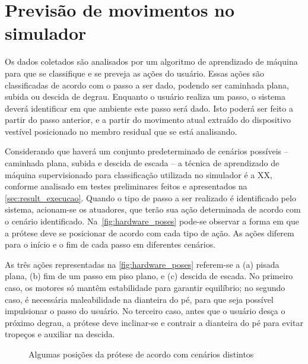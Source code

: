 \section{Previsão de movimentos no simulador}\label{sec:metodo_previsao}

Os dados coletados são analisados por um algoritmo de aprendizado de máquina para que se classifique e se preveja as ações do usuário. Essas ações são classificadas de acordo com o passo a ser dado, podendo ser caminhada plana, subida ou descida de degrau. Enquanto o usuário realiza um passo, o sistema deverá identificar em que ambiente este passo será dado. Isto poderá ser feito a partir do passo anterior, e a partir do movimento atual extraído do dispositivo vestível posicionado no membro residual que se está analisando.

Considerando que haverá um conjunto predeterminado de cenários possíveis -- caminhada plana, subida e descida de escada -- a técnica de aprendizado de máquina supervisionado para classificação utilizada no simulador é a XX, conforme analisado em testes preliminares feitos e apresentados na \autoref{sec:result_execucao}. Quando o tipo de passo a ser realizado é identificado pelo sistema, acionam-se os atuadores, que terão sua ação determinada de acordo com o cenário identificado. Na~\autoref{fig:hardware_poses} pode-se observar a forma em que a prótese deve se posicionar de acordo com cada tipo de ação. As ações diferem para o início e o fim de cada passo em diferentes cenários.

As três ações representadas na \autoref{fig:hardware_poses} referem-se a (a) pisada plana, (b) fim de um passo em piso plano, e (c) descida de escada. No primeiro caso, os motores só mantêm estabilidade para garantir equilíbrio; no segundo caso, é necessária maleabilidade na dianteira do pé, para que seja possível impulsionar o passo do usuário. No terceiro caso, antes que o usuário desça o próximo degrau, a prótese deve inclinar-se e contrair a dianteira do pé para evitar tropeços e auxiliar na descida.

\begin{figure}[h]
	\caption{\label{fig:hardware_poses}Algumas posições da prótese de acordo com cenários distintos}
	\begin{center}
	\end{center}
\end{figure}


